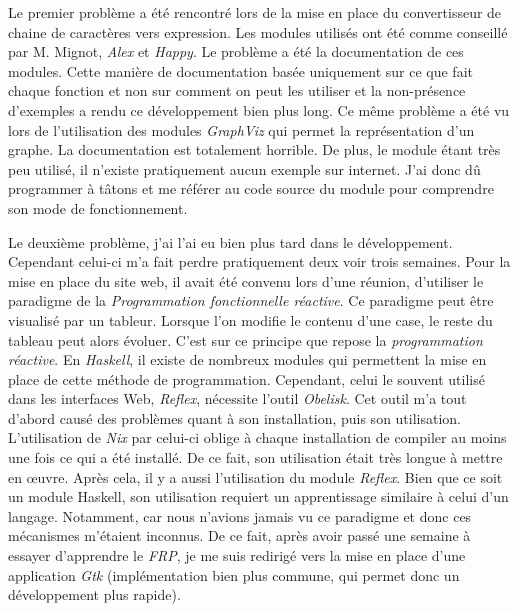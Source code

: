 \vphantom{}

Le premier problème a été rencontré lors de la mise en place du convertisseur de 
chaine de caractères vers expression. Les modules utilisés ont été comme 
conseillé par M. Mignot, \textit{Alex} et \textit{Happy}. Le problème a été la 
documentation de ces modules. Cette manière de documentation basée uniquement 
sur ce que fait chaque fonction et non sur comment on peut les utiliser et la 
non-présence d'exemples a rendu ce développement bien plus long. Ce même 
problème a été vu lors de l'utilisation des modules \textit{GraphViz} qui permet 
la représentation d'un graphe. La documentation est totalement horrible. De 
plus, le module étant très peu utilisé, il n'existe pratiquement aucun exemple 
sur internet. J'ai donc dû programmer à tâtons et me référer au code source du 
module pour comprendre son mode de fonctionnement.

\vphantom{}

Le deuxième problème, j'ai l'ai eu bien plus tard dans le développement. 
Cependant celui-ci m'a fait perdre pratiquement deux voir trois semaines. Pour 
la mise en place du site web, il avait été convenu lors d'une réunion, 
d'utiliser le paradigme de la \textit{Programmation fonctionnelle réactive}. Ce 
paradigme peut être visualisé par un tableur. Lorsque l'on modifie le contenu 
d'une case, le reste du tableau peut alors évoluer. C'est sur ce principe que 
repose la \textit{programmation réactive}. En \textit{Haskell}, il existe de 
nombreux modules qui permettent la mise en place de cette méthode de 
programmation. 
Cependant, celui le souvent utilisé dans les interfaces Web, \textit{Reflex}, 
nécessite l'outil \textit{Obelisk}. Cet outil m'a tout d'abord causé des 
problèmes quant à son installation, puis son utilisation. L'utilisation de 
\textit{Nix} par celui-ci oblige à chaque installation de compiler au moins 
une fois ce qui a été installé. De ce fait, son utilisation était très longue à 
mettre en \oe uvre. Après cela, il y a aussi l'utilisation du module 
\textit{Reflex}. Bien que ce soit un module Haskell, son utilisation requiert un 
apprentissage similaire à celui d'un langage. Notamment, car 
nous n'avions jamais vu ce paradigme et donc ces mécanismes m'étaient inconnus. 
De ce fait, après avoir passé une semaine à essayer d'apprendre le 
\textit{FRP}, je me suis redirigé vers la mise en place d'une application 
\textit{Gtk} (implémentation bien plus commune, qui permet donc un développement 
plus rapide).  

\vphantom{}

